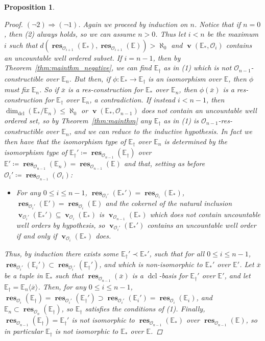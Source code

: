 \documentclass{amsart}
\newtheorem{proposition}[theorem]{Proposition}
\theoremstyle{remark}
\theoremstyle{definition}
\theoremstyle{plain}
\newcommand{\bE}{\mathbb E}
\newcommand{\cO}{\mathcal O}
\newcommand{\ox}{\overline{x}}
\DeclareMathOperator{\val}{\mathbf{v}}
\DeclareMathOperator{\res}{\mathbf{res}}
\DeclareMathOperator{\dcl}{\mathrm{dcl}}
\theoremstyle{plain}
\begin{document}
\begin{proposition}
\begin{proof}
        $(\lnot 2) \Rightarrow (\lnot 1)$. Again we proceed by induction on $n$. Notice that if $n=0$, then (2) always holds, so we can assume $n> 0$. Thus let $i<n$ be the maximum $i$ such that $d(\res_{\cO_{i+1}}(\bE_*), \res_{\cO_{i+1}}(\bE))> \aleph_0$ and $\val(\bE_*, \cO_i)$ contains an uncountable well ordered subset.
        If $i=n-1$, then by Theorem~\ref{thm:mainthm_negative}, we can find $\bE_\dagger$ as in (1) which is not $\cO_{n-1}$-constructible over $\bE_n$. But then, if $\phi : \bE_* \rightarrow \bE_\dagger$ is an isomorphism over $\bE$, then $\phi$ must fix $\bE_n$.
        So if $\ox$ is a res-construction for $\bE_*$ over $\bE_n$, then $\phi(\ox)$ is a res-construction for $\bE_\dagger$ over $\bE_n$, a contradiction.
        If instead $i<n-1$, then $\dim_{\dcl}(\bE_*/\bE_n)\le \aleph_0$ or $\val(\bE_*,\cO_{n-1})$ does not contain an uncountable well ordered set, so by Theorem~\ref{thm:mainthm} any $\bE_\dagger$ as in (1) is $\cO_{n-1}$-res-constructible over $\bE_n$, and we can reduce to the inductive hypothesis. In fact we then have that the isomorphism type of $\bE_\dagger$ over $\bE_n$ is determined by the isomorphism type of $\bE_\dagger'\coloneqq \res_{\cO_{n-1}}(\bE_{\dagger})$ over $\bE'\coloneqq \res_{\cO_{n-1}}(\bE_n)=\res_{\cO_{n-1}}(\bE)$ and that, setting as before $\cO_i'\coloneqq  \res_{\cO_{n-1}}(\cO_i)$:
        \begin{itemize}
            \item For any $0\leq i\leq n-1$, $\res_{\cO_{i}'}(\bE_*')=\res_{\cO_{i}}(\bE_*)$, $\res_{\cO_{i}'}(\bE')=\res_{\cO_{i}}(\bE)$ and the cokernel of the natural inclusion $\val_{\cO_{i}'}(\bE_*') \subseteq \val_{\cO_{i}}(\bE_*)$ is $\val_{\cO_{n-1}}(\bE_*)$ which does not contain uncountable well orders by hypothesis, so $\val_{\cO_{i}'}(\bE_*')$ contains an uncountable well order if and only if $\val_{\cO_{i}}(\bE_*)$ does.
        \end{itemize}
        Thus, by induction there exists some $\bE_\dagger' \prec \bE_*'$, such that for all $0\leq i\leq n-1$, $\res_{\cO_i'}(\bE_i') \subset \res_{\cO_i'}(\bE_\dagger')$, and which is non-isomorphic to $\bE_*'$ over $\bE'$. Let $\ox$ be a tuple in $\bE_*$ such that $\res_{\cO_{n-1}}(\ox)$ is a $\dcl$-basis for $\bE_\dagger'$ over $\bE'$, and let $\bE_\dagger = \bE_n\langle \ox \rangle$. Then, for any $0 \leq i \leq n-1$, $\res_{\cO_i}(\bE_\dagger) = \res_{\cO_i'}(\bE_\dagger') \supset \res_{\cO_i'}(\bE_i') = \res_{\cO_i}(\bE_i)$, and $\bE_n \subset \res_{\cO_n}(\bE_\dagger)$, so $\bE_\dagger$ satisfies the conditions of (1). Finally, $\res_{\cO_{n-1}}(\bE_\dagger) = \bE_\dagger'$ is not isomorphic to $\res_{\cO_{n-1}}(\bE_*)$ over $\res_{\cO_{n-1}}(\bE)$, so in particular $\bE_\dagger$ is not isomorphic to $\bE_*$ over $\bE$.
    \end{proof}
\end{proposition}
\end{document}
